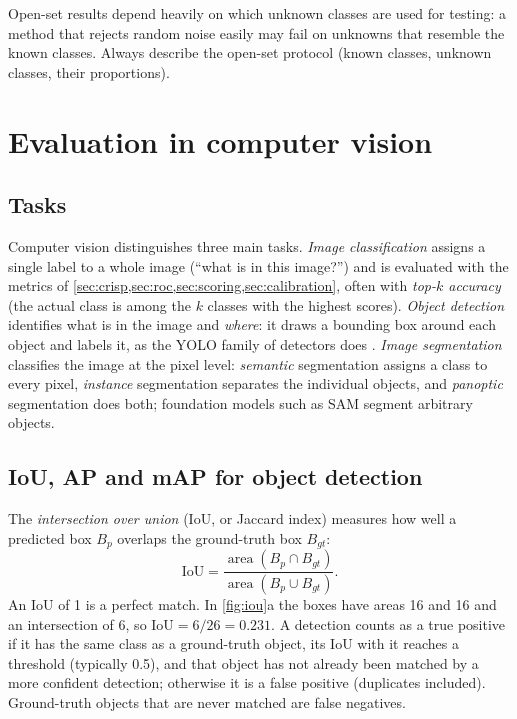 \begin{pitfall}
Open-set results depend heavily on which unknown classes are used for testing: a method that
rejects random noise easily may fail on unknowns that resemble the known classes. Always
describe the open-set protocol (known classes, unknown classes, their proportions).
\end{pitfall}

\section{Evaluation in computer vision\extsec}\label{sec:vision}

\subsection{Tasks}

Computer vision distinguishes three main tasks. \emph{Image classification} assigns a single
label to a whole image (``what is in this image?'') and is evaluated with the metrics of
\cref{sec:crisp,sec:roc,sec:scoring,sec:calibration}, often with \emph{top-$k$ accuracy} (the
actual class is among the $k$ classes with the highest scores). \emph{Object detection}
identifies what is in the image and \emph{where}: it draws a bounding box around each object
and labels it, as the YOLO family of detectors does \citep{redmon2016you,jocher2023yolov8}.
\emph{Image segmentation} classifies the image at the pixel level: \emph{semantic}
segmentation assigns a class to every pixel, \emph{instance} segmentation separates the
individual objects, and \emph{panoptic} segmentation does both; foundation models such as SAM
\citep{kirillov2023segment} segment arbitrary objects.

\subsection{IoU, AP and mAP for object detection}

The \emph{intersection over union} (IoU, or Jaccard index) measures how well a predicted box
$B_p$ overlaps the ground-truth box $B_{gt}$:
\begin{equation}
  \mathrm{IoU}=\frac{\operatorname{area}(B_p\cap B_{gt})}{\operatorname{area}(B_p\cup B_{gt})}.
\end{equation}
An IoU of 1 is a perfect match. In \cref{fig:iou}a the boxes have areas 16 and 16 and an
intersection of 6, so $\mathrm{IoU}=6/26=0.231$. A detection counts as a true positive if it
has the same class as a ground-truth object, its IoU with it reaches a threshold (typically
0.5), and that object has not already been matched by a more confident detection; otherwise it
is a false positive (duplicates included). Ground-truth objects that are never matched are
false negatives.

